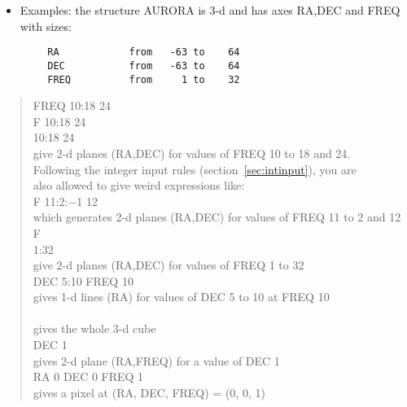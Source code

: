 \begin{itemize}
\item Examples:  the structure AURORA is 3-d and has axes RA,DEC and FREQ
                 with sizes:
\end{itemize}

\begin{verbatim}
        RA            from   -63 to    64
        DEC           from   -63 to    64 
        FREQ          from     1 to    32
\end{verbatim}

\begin{verse}
 FREQ 10:18 24\\
 F 10:18 24\\
 10:18 24\\
give 2-d planes (RA,DEC) for values of FREQ 10 to 18 and 24.\\
Following the integer input rules (section~\ref{sec:intinput}), you are\\
also allowed to give weird expressions like:\\

 F 11:2:$-$1 12\\
which generates  2-d planes (RA,DEC) for values of FREQ 11 to 2 and 12\\ 


 F\\
 1:32\\
give 2-d planes (RA,DEC) for values of FREQ 1 to 32\\

 DEC 5:10 FREQ 10\\
gives 1-d lines (RA) for values of DEC 5 to 10 at FREQ 10\\ 

\\
gives the whole 3-d cube\\

 DEC 1\\
gives 2-d plane (RA,FREQ) for a value of DEC 1\\

 RA 0 DEC 0 FREQ 1\\
gives a pixel at (RA, DEC, FREQ) = (0, 0, 1)

\end{verse}

